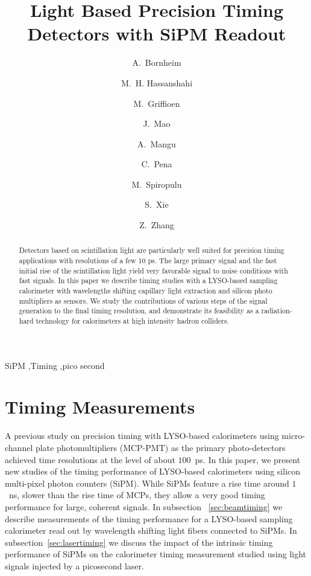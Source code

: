 \documentclass[preprint,1p]{elsarticle}
\begin{document}
  
\linenumbers

\begin{frontmatter}

\title{Light Based Precision Timing Detectors with SiPM Readout}

\author[1]{A.~Bornheim}
\author[2]{M.~H. Hassanshahi}
\author[1]{M.~Griffioen}
\author[1]{J.~Mao}
\author[1]{A.~Mangu}
\author[1]{C.~Pena}
\author[1]{M.~Spiropulu}
\author[1]{S.~Xie }
\author[1]{Z.~Zhang}
\address[1]{California Institute of Technology, Pasadena, CA, USA}
\address[2]{Institute for Research in Fundamental Science, Tehran, Iran}


\begin{abstract}
Detectors based on scintillation light are particularly well suited for precision timing applications with 
resolutions of a few 10 ps. The large primary signal and the fast initial rise of the scintillation
light yield very favorable signal to noise conditions with fast signals. In this paper we describe timing 
studies with a LYSO-based sampling calorimeter with wavelengths shifting capillary light extraction and silicon
photo multipliers as sensors. We study the contributions of various steps of the signal generation to 
the final timing resolution, and demonstrate its feasibility as a radiation-hard technology for calorimeters
at high intensity hadron colliders.
\end{abstract}

\begin{keyword}
SiPM \sep Timing \sep pico second
\end{keyword}

\end{frontmatter}

%
%

%
%
  
%
%
  
%
%

\section{Timing Measurements} 

A previous study on precision timing with LYSO-based calorimeters
\cite{Anderson:2015gha} using micro-channel plate photomultipliers (MCP-PMT) 
as the primary photo-detectors achieved time resolutions at the level of 
about $100$~ps. In this paper, we present new studies of the
timing performance of LYSO-based calorimeters using silicon multi-pixel 
photon counters (SiPM). While SiPMs feature a rise time around
$1$~ns, slower than the rise time of MCPs, they allow a very good timing
performance for large, coherent signals. In subsection
~\ref{sec:beamtiming} we describe measurements of the timing performance 
for a LYSO-based sampling calorimeter read out by wavelength shifting 
light fibers connected to SiPMs. In subsection~\ref{sec:lasertiming}
we discuss the impact of the intrinsic timing performance of SiPMs on 
the calorimeter timing measurement studied using light signals injected
by a picosecond laser.
\end{document}
